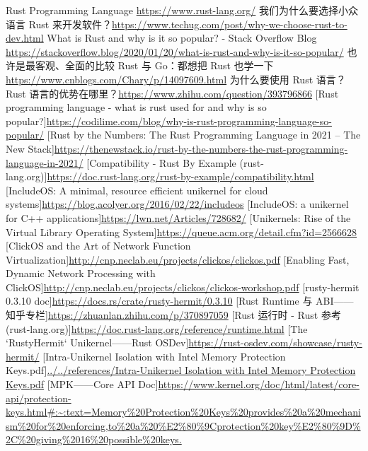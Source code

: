 \documentclass[UTF8,fontset=none,linespread=1.15]{ctexart}
\begin{document}
\begin{thebibliography}{99}
 Rust Programming Language \url{https://www.rust-lang.org/}
 我们为什么要选择小众语言 Rust 来开发软件？\url{https://www.techug.com/post/why-we-choose-rust-to-dev.html}
 What is Rust and why is it so popular? - Stack Overflow Blog \url{https://stackoverflow.blog/2020/01/20/what-is-rust-and-why-is-it-so-popular/}
 也许是最客观、全面的比较 Rust 与 Go：都想把 Rust 也学一下\url{https://www.cnblogs.com/Chary/p/14097609.html}
 为什么要使用 Rust 语言？Rust 语言的优势在哪里？\url{https://www.zhihu.com/question/393796866}
 [Rust programming language - what is rust used for and why is so popular?]\url{https://codilime.com/blog/why-is-rust-programming-language-so-popular/}
 [Rust by the Numbers: The Rust Programming Language in 2021 – The New Stack]\url{https://thenewstack.io/rust-by-the-numbers-the-rust-programming-language-in-2021/}
 [Compatibility - Rust By Example (rust-lang.org)]\url{https://doc.rust-lang.org/rust-by-example/compatibility.html}
  [IncludeOS: A minimal, resource efficient unikernel for cloud systems]\url{https://blog.acolyer.org/2016/02/22/includeos}
 [IncludeOS: a unikernel for C++ applications]\url{https://lwn.net/Articles/728682/}
 [Unikernels: Rise of the Virtual Library Operating System]\url{https://queue.acm.org/detail.cfm?id=2566628}
 [ClickOS and the Art of Network Function Virtualization]\url{http://cnp.neclab.eu/projects/clickos/clickos.pdf}
 [Enabling Fast, Dynamic Network Processing with ClickOS]\url{http://cnp.neclab.eu/projects/clickos/clickos-workshop.pdf}
 [rusty-hermit 0.3.10 doc]\url{https://docs.rs/crate/rusty-hermit/0.3.10}
 [Rust Runtime 与 ABI——知乎专栏]\url{https://zhuanlan.zhihu.com/p/370897059}
 [Rust 运行时 - Rust 参考 (rust-lang.org)]\url{https://doc.rust-lang.org/reference/runtime.html}
 [The `RustyHermit` Unikernel——Rust OSDev]\url{https://rust-osdev.com/showcase/rusty-hermit/}
 [Intra-Unikernel Isolation with Intel Memory Protection Keys.pdf]\url{../../references/Intra-Unikernel Isolation with Intel Memory Protection Keys.pdf}
 [MPK——Core API Doc]\url{https://www.kernel.org/doc/html/latest/core-api/protection-keys.html#:~:text=Memory%20Protection%20Keys%20provides%20a%20mechanism%20for%20enforcing,to%20a%20%E2%80%9Cprotection%20key%E2%80%9D%2C%20giving%2016%20possible%20keys.}

\end{thebibliography}
\end{document}
